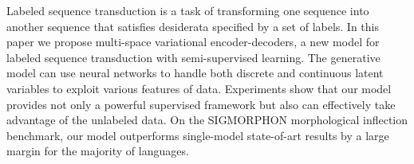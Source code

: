 Labeled sequence transduction is a task of transforming one sequence into another sequence that satisfies desiderata specified by a set of labels. In this paper we propose multi-space variational encoder-decoders, a new model for labeled sequence transduction with semi-supervised learning. The generative model can use neural networks to handle both discrete and continuous latent variables to exploit various features of data. Experiments show that our model provides not only a powerful supervised framework but also can effectively take advantage of the unlabeled data. On the SIGMORPHON morphological inflection benchmark, our model outperforms single-model state-of-art results by a large margin for the majority of languages.
